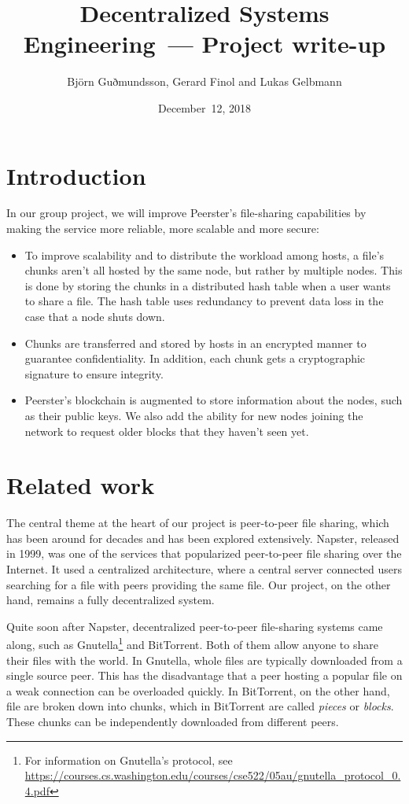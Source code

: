 \documentclass[12pt,a4paper,draft]{article}
\title{Decentralized Systems Engineering~--- Project write-up}
\author{Björn Guðmundsson, Gerard Finol and Lukas Gelbmann}
\date{December~12, 2018}
\begin{document}
\maketitle
\tableofcontents

\section{Introduction}

In our group project, we will improve Peerster's file-sharing capabilities by making the service more reliable, more scalable and more secure:

\begin{itemize}
    \item To improve scalability and to distribute the workload among hosts, a file's chunks aren't all hosted by the same node, but rather by multiple nodes.
    This is done by storing the chunks in a distributed hash table when a user wants to share a file.
    The hash table uses redundancy to prevent data loss in the case that a node shuts down.
    \item Chunks are transferred and stored by hosts in an encrypted manner to guarantee confidentiality.
    In addition, each chunk gets a cryptographic signature to ensure integrity.
    \item Peerster's blockchain is augmented to store information about the nodes, such as their public keys.
    We also add the ability for new nodes joining the network to request older blocks that they haven't seen yet.
\end{itemize}

\section{Related work}

The central theme at the heart of our project is peer-to-peer file sharing, which has been around for decades and has been explored extensively.
Napster, released in 1999, was one of the services that popularized peer-to-peer file sharing over the Internet.
It used a centralized architecture, where a central server connected users searching for a file with peers providing the same file.
Our project, on the other hand, remains a fully decentralized system.

Quite soon after Napster, decentralized peer-to-peer file-sharing systems came along, such as Gnutella\footnote{For information on Gnutella's protocol, see \url{https://courses.cs.washington.edu/courses/cse522/05au/gnutella\_protocol\_0.4.pdf}} and BitTorrent.
Both of them allow anyone to share their files with the world.
In Gnutella, whole files are typically downloaded from a single source peer.
This has the disadvantage that a peer hosting a popular file on a weak connection can be overloaded quickly.
In BitTorrent, on the other hand, file are broken down into chunks, which in BitTorrent are called \emph{pieces} or \emph{blocks}.
These chunks can be independently downloaded from different peers.
\end{document}
